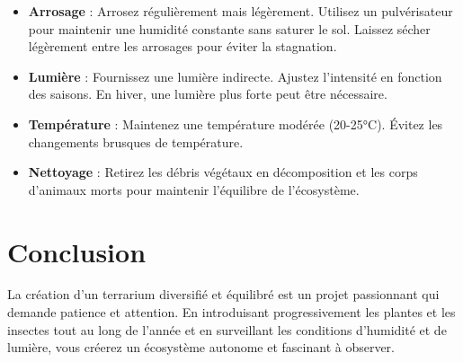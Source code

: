 \begin{itemize}
    \item \textbf{Arrosage} : Arrosez régulièrement mais légèrement. Utilisez un pulvérisateur pour maintenir une humidité constante sans saturer le sol. Laissez sécher légèrement entre les arrosages pour éviter la stagnation.
    \item \textbf{Lumière} : Fournissez une lumière indirecte. Ajustez l'intensité en fonction des saisons. En hiver, une lumière plus forte peut être nécessaire.
    \item \textbf{Température} : Maintenez une température modérée (20-25°C). Évitez les changements brusques de température.
    \item \textbf{Nettoyage} : Retirez les débris végétaux en décomposition et les corps d'animaux morts pour maintenir l'équilibre de l'écosystème.
\end{itemize}

\section*{Conclusion}
La création d'un terrarium diversifié et équilibré est un projet passionnant qui demande patience et attention. En introduisant progressivement les plantes et les insectes tout au long de l'année et en surveillant les conditions d'humidité et de lumière, vous créerez un écosystème autonome et fascinant à observer.



